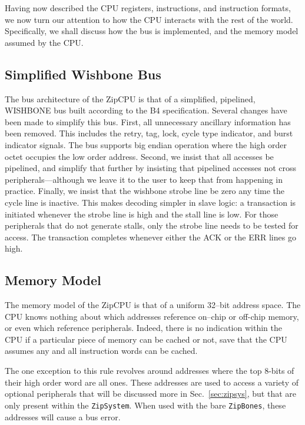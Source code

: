 \documentclass{gqtekspec}
\begin{document}
Having now described the CPU registers, instructions, and instruction formats,
we now turn our attention to how the CPU interacts with the rest of the world.
Specifically, we shall discuss how the bus is implemented, and the memory
model assumed by the CPU.

\subsection{Simplified Wishbone Bus}\label{ssec:bus}
The bus architecture of the ZipCPU is that of a simplified, pipelined, WISHBONE
bus built according to the B4 specification.  Several changes have been made to
simplify this bus.  First, all unnecessary ancillary information has been
removed.  This includes the retry, tag, lock, cycle type indicator, and burst
indicator signals.  The bus supports big endian operation where the high order
octet occupies the low order address.  Second, we insist that all
accesses be pipelined, and simplify that further by insisting that pipelined
accesses not cross peripherals---although we leave it to the user to keep that
from happening in practice.  Finally, we insist that the wishbone strobe line
be zero any time the cycle line is inactive.  This makes decoding simpler
in slave logic: a transaction is initiated whenever the strobe line is high
and the stall line is low.  For those peripherals that do not generate stalls,
only the strobe line needs to be tested for access.  The transaction completes
whenever either the ACK or the ERR lines go high.

\subsection{Memory Model}\label{ssec:memory}
The memory model of the ZipCPU is that of a uniform 32--bit address space.
The CPU knows nothing about which addresses reference on--chip or off-chip
memory, or even which reference peripherals.  Indeed, there is no indication
within the CPU if a particular piece of memory can be cached or not, save that
the CPU assumes any and all instruction words can be cached.

The one exception to this rule revolves around addresses where the top 8-bits
of their high order word are all ones.  These addresses are used to access a
variety of optional peripherals that will be discussed more in
Sec.~\ref{sec:zipsys}, but that are only present within the {\tt ZipSystem}.
When used with the bare {\tt ZipBones}, these addresses will cause a bus error.
\end{document}
